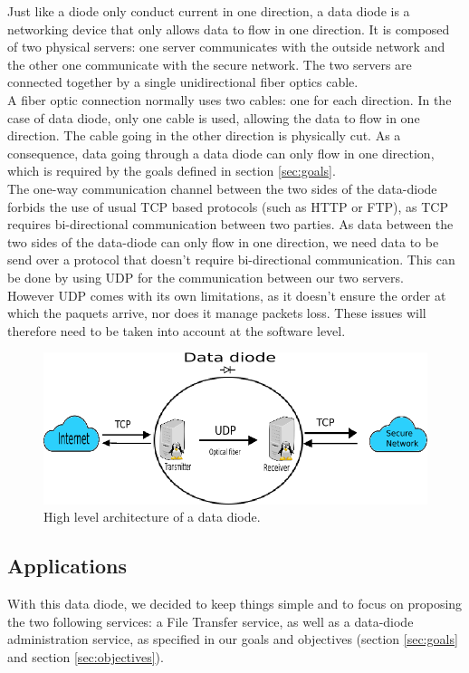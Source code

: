 \documentclass[a4paper,11pt]{article}
\begin{document}
Just like a diode only conduct current in one direction, a data diode is a networking device that only allows data to flow in one direction. It is composed of two physical servers: one server communicates with the outside network and the other one communicate with the secure network. The two servers are connected together by a single unidirectional fiber optics cable.\\

A fiber optic connection normally uses two cables: one for each direction. In the case of 	 data diode, only one cable is used, allowing the data to flow in one direction. The cable going in the other direction is physically cut. As a consequence, data going through a data diode can only flow in one direction, which is required by the goals defined in section \ref{sec:goals}.\\

The one-way communication channel between the two sides of the data-diode forbids the use of usual TCP based protocols (such as HTTP or FTP), as TCP requires bi-directional communication between two parties. As data between the two sides of the data-diode can only flow in one direction, we need data to be send over a protocol that doesn't require bi-directional communication. This can be done by using UDP for the communication between our two servers.\\

However UDP comes with its own limitations, as it doesn't ensure the order at which the paquets arrive, nor does it manage packets loss. These issues will therefore need to be taken into account at the software level.


\begin{figure}
	\includegraphics[scale=0.7]{img/network.png}
	\caption{High level architecture of a data diode.}
\end{figure}


\subsection{Applications}
With this data diode, we decided to keep things simple and to focus on proposing the two following services: a File Transfer service, as well as a data-diode administration service, as specified in our goals and objectives (section \ref{sec:goals} and section \ref{sec:objectives}).\\
\end{document}
